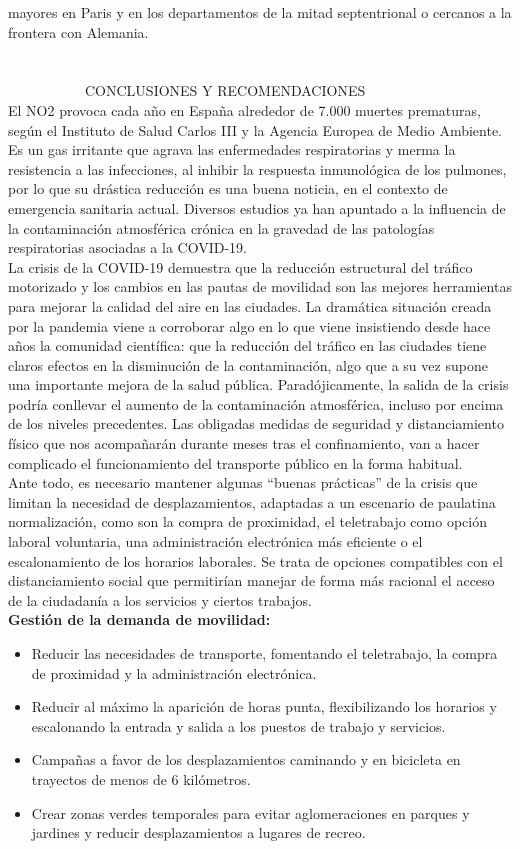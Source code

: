 \documentclass[a4paper,11pt]{article}
\begin{document}
mayores en Paris y en los departamentos de la mitad septentrional o cercanos a la frontera con Alemania.
\ \ \ \ \ \ \ \ \ \ \ \ \ \ \   \ \ \ \ \ \ \\ \ \ \ \ \ \ \ \ \ \ \ \ \ \   \ \ \ \ \ \ \\ \ \ \ \ \ \ \ \ \ \ \ \ \ \   \ \ \ \ \ \ \\ \ \ \ \ \ \ \ \ \ \ \ CONCLUSIONES Y RECOMENDACIONES
\\ El NO2 provoca cada año en España alrededor de 7.000 muertes prematuras, según el Instituto
de Salud Carlos III y la Agencia Europea de Medio Ambiente. Es un gas irritante que agrava
las enfermedades respiratorias y merma la resistencia a las infecciones, al inhibir la respuesta
inmunológica de los pulmones, por lo que su drástica reducción es una buena noticia, en el
contexto de emergencia sanitaria actual. Diversos estudios ya han apuntado a la influencia de
la contaminación atmosférica crónica en la gravedad de las patologías respiratorias asociadas
a la COVID-19.
\\ La crisis de la COVID-19 demuestra que la reducción estructural del tráfico motorizado y los
cambios en las pautas de movilidad son las mejores herramientas para mejorar la calidad del
aire en las ciudades. La dramática situación creada por la pandemia viene a corroborar algo en
lo que viene insistiendo desde hace años la comunidad científica: que la reducción del tráfico
en las ciudades tiene claros efectos en la disminución de la contaminación, algo que a su vez
supone una importante mejora de la salud pública.
Paradójicamente, la salida de la crisis podría conllevar el aumento de la contaminación atmosférica,
incluso por encima de los niveles precedentes. Las obligadas medidas de seguridad
y distanciamiento físico que nos acompañarán durante meses tras el confinamiento, van a hacer
complicado el funcionamiento del transporte público en la forma habitual.
\\ Ante todo, es necesario mantener algunas “buenas prácticas” de la crisis que limitan la necesidad
de desplazamientos, adaptadas a un escenario de paulatina normalización, como son
la compra de proximidad, el teletrabajo como opción laboral voluntaria, una administración
electrónica más eficiente o el escalonamiento de los horarios laborales. Se trata de opciones
compatibles con el distanciamiento social que permitirían manejar de forma más racional el
acceso de la ciudadanía a los servicios y ciertos trabajos.
\textbf{\\ Gestión de la demanda de movilidad:}
\begin{itemize}
\item Reducir las necesidades de transporte, fomentando el teletrabajo, la compra de proximidad
y la administración electrónica.
\item Reducir al máximo la aparición de horas punta, flexibilizando los horarios y escalonando
la entrada y salida a los puestos de trabajo y servicios.
\item Campañas a favor de los desplazamientos caminando y en bicicleta en trayectos de
menos de 6 kilómetros.
\item Crear zonas verdes temporales para evitar aglomeraciones en parques y jardines y reducir
desplazamientos a lugares de recreo.
\end{itemize}
\end{document}
